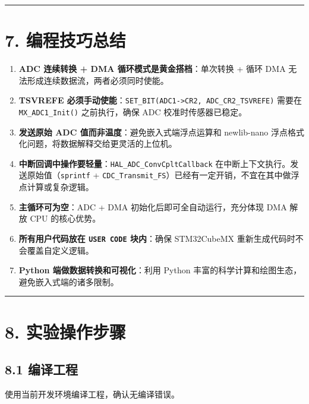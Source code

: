 \documentclass[
  chinese,
  UTF8,
  oneside,
  openany]{ctexbook}
\providecommand{\tightlist}{%
  \setlength{\itemsep}{0pt}\setlength{\parskip}{0pt}}
\begin{document}
\begin{center}\rule{0.5\linewidth}{0.5pt}\end{center}

\section{7. 编程技巧总结}\label{ux7f16ux7a0bux6280ux5de7ux603bux7ed3-2}

\begin{enumerate}
\def\labelenumi{\arabic{enumi}.}
\tightlist
\item
  \textbf{ADC 连续转换 + DMA 循环模式是黄金搭档}：单次转换 + 循环 DMA
  无法形成连续数据流，两者必须同时使能。
\item
  \textbf{TSVREFE
  必须手动使能}：\texttt{SET\_BIT(ADC1-\textgreater{}CR2,\ ADC\_CR2\_TSVREFE)}
  需要在 \texttt{MX\_ADC1\_Init()} 之前执行，确保 ADC
  校准时传感器已稳定。
\item
  \textbf{发送原始 ADC 值而非温度}：避免嵌入式端浮点运算和 newlib-nano
  浮点格式化问题，将数据解释交给更灵活的上位机。
\item
  \textbf{中断回调中操作要轻量}：\texttt{HAL\_ADC\_ConvCpltCallback}
  在中断上下文执行。发送原始值（\texttt{sprintf} +
  \texttt{CDC\_Transmit\_FS}）已经有一定开销，不宜在其中做浮点计算或复杂逻辑。
\item
  \textbf{主循环可为空}：ADC + DMA 初始化后即可全自动运行，充分体现 DMA
  解放 CPU 的核心优势。
\item
  \textbf{所有用户代码放在 \texttt{USER\ CODE} 块内}：确保 STM32CubeMX
  重新生成代码时不会覆盖自定义逻辑。
\item
  \textbf{Python 端做数据转换和可视化}：利用 Python
  丰富的科学计算和绘图生态，避免嵌入式端的诸多限制。
\end{enumerate}

\begin{center}\rule{0.5\linewidth}{0.5pt}\end{center}

\section{8. 实验操作步骤}\label{ux5b9eux9a8cux64cdux4f5cux6b65ux9aa4-2}

\subsection{8.1 编译工程}\label{ux7f16ux8bd1ux5de5ux7a0b-2}

使用当前开发环境编译工程，确认无编译错误。
\end{document}
